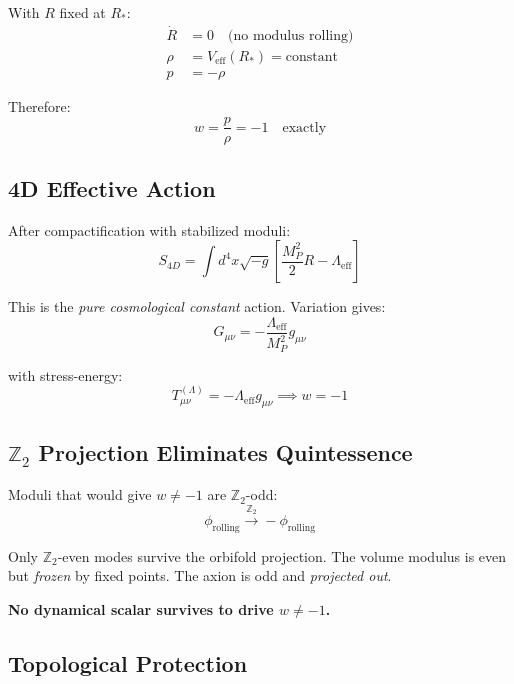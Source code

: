 \documentclass[12pt,a4paper]{article}
\begin{document}
With $R$ fixed at $R_*$:
\begin{align}
\dot{R} &= 0 \quad \text{(no modulus rolling)} \\
\rho &= V_{\text{eff}}(R_*) = \text{constant} \\
p &= -\rho
\end{align}

Therefore:
\begin{equation}
\boxed{w = \frac{p}{\rho} = -1 \quad \text{exactly}}
\end{equation}

\subsection{4D Effective Action}

After compactification with stabilized moduli:
\begin{equation}
S_{4D} = \int d^4x \sqrt{-g} \left[\frac{M_P^2}{2} R - \Lambda_{\text{eff}}\right]
\end{equation}

This is the \textit{pure cosmological constant} action. Variation gives:
\begin{equation}
G_{\mu\nu} = -\frac{\Lambda_{\text{eff}}}{M_P^2} g_{\mu\nu}
\end{equation}

with stress-energy:
\begin{equation}
T_{\mu\nu}^{(\Lambda)} = -\Lambda_{\text{eff}} g_{\mu\nu} \implies w = -1
\end{equation}

\subsection{$\mathbb{Z}_2$ Projection Eliminates Quintessence}

Moduli that would give $w \neq -1$ are $\mathbb{Z}_2$-odd:
\begin{equation}
\phi_{\text{rolling}} \xrightarrow{\mathbb{Z}_2} -\phi_{\text{rolling}}
\end{equation}

Only $\mathbb{Z}_2$-even modes survive the orbifold projection. The volume modulus is even but \textit{frozen} by fixed points. The axion is odd and \textit{projected out}.

\textbf{No dynamical scalar survives to drive $w \neq -1$.}

\subsection{Topological Protection}
\end{document}
